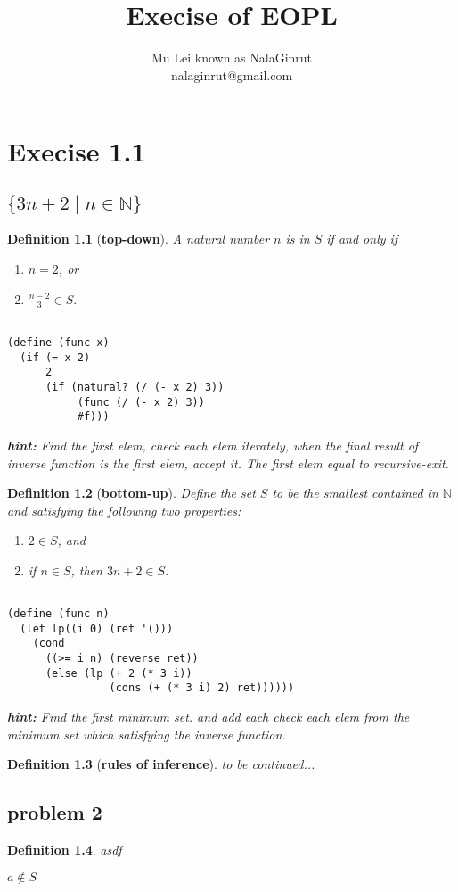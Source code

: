 \documentclass[11pt,a4paper]{report}
\begin{document}
\title{Execise of EOPL}
\author{Mu Lei known as NalaGinrut\\nalaginrut@gmail.com}
\maketitle
\newtheorem{defn}{Definition}[section]
\chapter{Execise 1.1}
\section{$\{3n + 2 \mid n \in \mathbb{N} \}$}
\begin{defn}[\bf top-down]
A natural number $n$ is in $S$ if and only if
\begin{enumerate}
\item 
$n=2$, or
\item 
$\frac{n-2}{3} \in S.$
\end{enumerate}
\lstset{language=Lisp,escapechar=@,style=custom-lisp}
\begin{lstlisting}[frame=single]  % Start your code-block

(define (func x)
  (if (= x 2)
      2 
      (if (natural? (/ (- x 2) 3))
           (func (/ (- x 2) 3)) 
           #f)))
\end{lstlisting}
{\bf hint:} Find the first elem, check each elem iterately, when the final result of {\color{red} inverse function} is the first elem, accept it.
The first elem equal to recursive-exit.
\end{defn}
\begin{defn}[\bf bottom-up]
Define the set $S$ to be the smallest contained in $\mathbb{N}$ and satisfying the following two properties:
\begin{enumerate}
\item
$2 \in S$, and
\item
if $n \in S$, then $ 3n+2 \in S. $
\end{enumerate}
\lstset{language=Lisp,escapechar=@,style=custom-lisp}
\begin{lstlisting}[frame=single]  % Start your code-block

(define (func n) 
  (let lp((i 0) (ret '()))
    (cond 
      ((>= i n) (reverse ret))
      (else (lp (+ 2 (* 3 i)) 
                (cons (+ (* 3 i) 2) ret))))))
\end{lstlisting}
{\bf hint:} Find the first minimum set. and add each check each elem from the minimum set which satisfying the inverse function.
\end{defn}

\begin{defn}[\bf rules of inference]
to be continued...
\end{defn}

\section{problem 2}
\begin{defn}
asdf
\end{defn}
$ a \not\in S $
\end{document}
